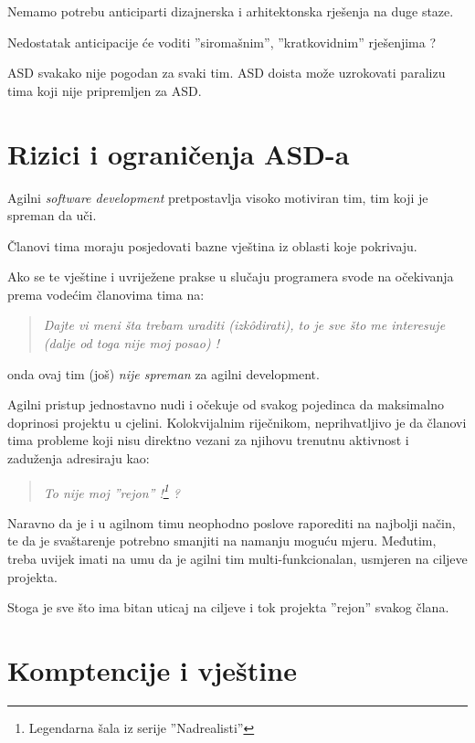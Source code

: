 \documentclass[lmodern, utf8, zavrsni]{fit}
\begin{document}
Nemamo potrebu anticiparti dizajnerska i arhitektonska rješenja na duge staze.

Nedostatak anticipacije će voditi ''siromašnim'', ''kratkovidnim'' rješenjima ?

ASD svakako nije pogodan za svaki tim. ASD doista može uzrokovati paralizu tima koji nije pripremljen za ASD.

\section{Rizici i ograničenja ASD-a}

Agilni \emph{software development} pretpostavlja visoko motiviran tim, tim koji je spreman da uči. 

Članovi tima moraju posjedovati bazne vještina iz oblasti koje pokrivaju.

Ako se te vještine i uvriježene prakse u slučaju programera svode na očekivanja prema vodećim članovima tima na:

\begin{quotation}
  \emph{Dajte vi meni šta trebam uraditi (izk\^odirati), to je sve što me interesuje (dalje od toga nije moj posao) !}
\end{quotation}

onda ovaj tim (još) \emph{nije spreman} za agilni development.

Agilni pristup jednostavno nudi i očekuje od svakog pojedinca da maksimalno doprinosi projektu u cjelini. Kolokvijalnim riječnikom, neprihvatljivo je da članovi tima probleme koji nisu direktno vezani za njihovu trenutnu aktivnost i zaduženja adresiraju kao:

\begin{quotation}
  \emph{To nije moj ''rejon'' !\footnote{Legendarna šala iz serije ''Nadrealisti''} ?}
\end{quotation}

Naravno da je i u agilnom timu neophodno poslove raporediti na najbolji način, te da je svaštarenje potrebno smanjiti na namanju moguću mjeru.
Međutim, treba uvijek imati na umu da je agilni tim multi-funkcionalan, usmjeren na ciljeve projekta.

Stoga je sve što ima bitan uticaj na ciljeve i tok projekta ''rejon'' svakog člana.

\section{Komptencije i vještine}
\end{document}
